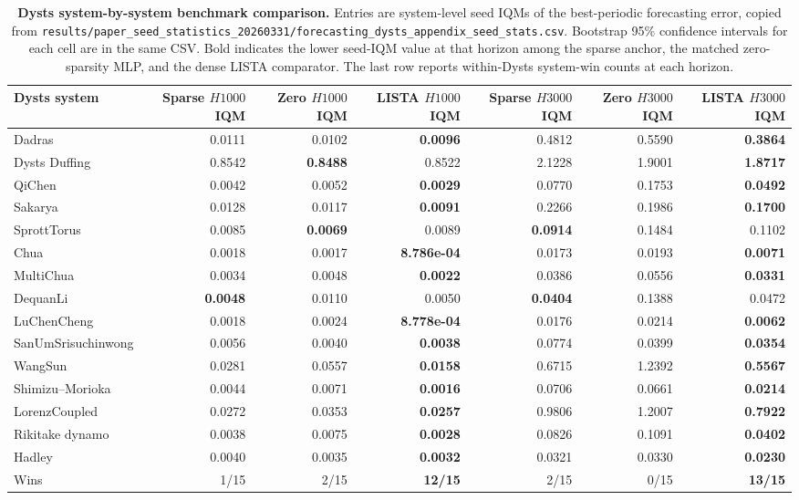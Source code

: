 \begin{table}[ht]
\centering
\scriptsize
\setlength{\tabcolsep}{4pt}
\begin{tabular}{p{}rrrrrr}
\toprule
Dysts system & Sparse $H1000$ IQM & Zero $H1000$ IQM & LISTA $H1000$ IQM & Sparse $H3000$ IQM & Zero $H3000$ IQM & LISTA $H3000$ IQM \\
\midrule
Dadras & 0.0111 & 0.0102 & \textbf{0.0096} & 0.4812 & 0.5590 & \textbf{0.3864} \\
Dysts Duffing & 0.8542 & \textbf{0.8488} & 0.8522 & 2.1228 & 1.9001 & \textbf{1.8717} \\
QiChen & 0.0042 & 0.0052 & \textbf{0.0029} & 0.0770 & 0.1753 & \textbf{0.0492} \\
Sakarya & 0.0128 & 0.0117 & \textbf{0.0091} & 0.2266 & 0.1986 & \textbf{0.1700} \\
SprottTorus & 0.0085 & \textbf{0.0069} & 0.0089 & \textbf{0.0914} & 0.1484 & 0.1102 \\
Chua & 0.0018 & 0.0017 & \textbf{8.786e-04} & 0.0173 & 0.0193 & \textbf{0.0071} \\
MultiChua & 0.0034 & 0.0048 & \textbf{0.0022} & 0.0386 & 0.0556 & \textbf{0.0331} \\
DequanLi & \textbf{0.0048} & 0.0110 & 0.0050 & \textbf{0.0404} & 0.1388 & 0.0472 \\
LuChenCheng & 0.0018 & 0.0024 & \textbf{8.778e-04} & 0.0176 & 0.0214 & \textbf{0.0062} \\
SanUmSrisuchinwong & 0.0056 & 0.0040 & \textbf{0.0038} & 0.0774 & 0.0399 & \textbf{0.0354} \\
WangSun & 0.0281 & 0.0557 & \textbf{0.0158} & 0.6715 & 1.2392 & \textbf{0.5567} \\
Shimizu--Morioka & 0.0044 & 0.0071 & \textbf{0.0016} & 0.0706 & 0.0661 & \textbf{0.0214} \\
LorenzCoupled & 0.0272 & 0.0353 & \textbf{0.0257} & 0.9806 & 1.2007 & \textbf{0.7922} \\
Rikitake dynamo & 0.0038 & 0.0075 & \textbf{0.0028} & 0.0826 & 0.1091 & \textbf{0.0402} \\
Hadley & 0.0040 & 0.0035 & \textbf{0.0032} & 0.0321 & 0.0330 & \textbf{0.0230} \\
\midrule
Wins & 1/15 & 2/15 & \textbf{12/15} & 2/15 & 0/15 & \textbf{13/15} \\
\bottomrule
\end{tabular}
\caption{\textbf{Dysts system-by-system benchmark comparison.} Entries are system-level seed IQMs of the best-periodic forecasting error, copied from \texttt{results/paper\_seed\_statistics\_20260331/forecasting\_dysts\_appendix\_seed\_stats.csv}. Bootstrap 95\% confidence intervals for each cell are in the same CSV. Bold indicates the lower seed-IQM value at that horizon among the sparse anchor, the matched zero-sparsity MLP, and the dense LISTA comparator. The last row reports within-Dysts system-win counts at each horizon.}
\label{tab:review-cross-system-dysts-20260314}
\end{table}

